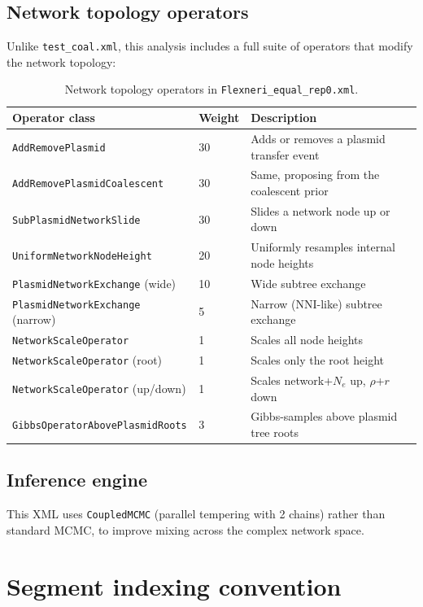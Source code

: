 \documentclass[11pt]{article}
\begin{document}
\subsection{Network topology operators}

Unlike \texttt{test\_coal.xml}, this analysis includes a full suite of operators that modify the network topology:

\begin{table}[H]
\centering
\small
\begin{tabular}{@{} l l p{6.5cm} @{}}
\toprule
\textbf{Operator class} & \textbf{Weight} & \textbf{Description} \\
\midrule
\texttt{AddRemovePlasmid} & 30 & Adds or removes a plasmid transfer event \\
\texttt{AddRemovePlasmidCoalescent} & 30 & Same, proposing from the coalescent prior \\
\texttt{SubPlasmidNetworkSlide} & 30 & Slides a network node up or down \\
\texttt{UniformNetworkNodeHeight} & 20 & Uniformly resamples internal node heights \\
\texttt{PlasmidNetworkExchange} (wide) & 10 & Wide subtree exchange \\
\texttt{PlasmidNetworkExchange} (narrow) & 5 & Narrow (NNI-like) subtree exchange \\
\texttt{NetworkScaleOperator} & 1 & Scales all node heights \\
\texttt{NetworkScaleOperator} (root) & 1 & Scales only the root height \\
\texttt{NetworkScaleOperator} (up/down) & 1 & Scales network+$N_e$ up, $\rho$+$r$ down \\
\texttt{GibbsOperatorAbovePlasmidRoots} & 3 & Gibbs-samples above plasmid tree roots \\
\bottomrule
\end{tabular}
\caption{Network topology operators in \texttt{Flexneri\_equal\_rep0.xml}.}
\end{table}

\subsection{Inference engine}

This XML uses \texttt{CoupledMCMC} (parallel tempering with 2 chains) rather than standard MCMC, to improve mixing across the complex network space.

\section{Segment indexing convention}
\end{document}

